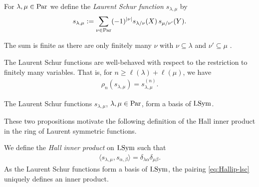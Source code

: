 \documentclass[11pt]{amsart}
\begin{document}
\begin{defin}\label{def:lsf}
    For $\lambda,\mu \in \mathrm{Par}$ we define the \emph{Laurent Schur function $s_{\lambda,\mu}$} by 
    \begin{align}
        s_{\lambda,\mu}
        :=
        \sum_{\nu \in \mathrm{Par}}(-1)^{|\nu|}
        s_{\lambda/\nu}(X)\,
        s_{\mu/\nu'}(Y). \label{eq:ksf}
    \end{align}
\end{defin}
The sum is finite as there are only finitely many $\nu $ with $\nu \subseteq \lambda$ and $\nu' \subseteq \mu$ \cite[Ch.~I, \S5, Eq.~(5.7)]{Mac15}. 

\begin{prop}\label{prop:rhoschur}
    The Laurent Schur functions are well-behaved with respect to the restriction to finitely many variables. That is, for $n \geq \ell(\lambda) + \ell(\mu)$, we have
    \begin{align}
        \rho_n(s_{\lambda,\mu}) = s_{\lambda,\mu}^{(n)}.
    \end{align}
\end{prop}

\begin{prop}\label{prop:sb}
The Laurent Schur functions
        $ s_{\lambda,\mu}$, $\lambda,\mu\in\mathrm{Par}$,
    form a basis of $\mathrm{LSym}$. 
\end{prop}

These two propositions motivate the following definition of the Hall inner product in the ring of Laurent symmetric functions.
\begin{defin}
    We define the \emph{Hall inner product} on $\mathrm{LSym}$ such that
    \begin{align}
        \langle s_{\lambda,\mu},s_{\alpha,\beta}\rangle = \delta_{\lambda\alpha}\delta_{\mu\beta}. \label{eq:Hallip-lsc}
    \end{align}
    As the Laurent Schur functions form a basis of $\mathrm{LSym}$, the pairing \cref{eq:Hallip-lsc} uniquely defines an inner product. 
\end{defin}
\end{document}
